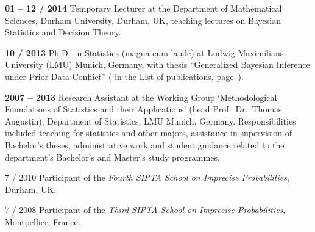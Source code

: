\documentclass[a4paper]{simplecv}
\begin{document}
\begin{topic}
\item[\hspace*{-2ex}\bfseries 01 -- 12 / 2014]Temporary Lecturer
                  at the Department of Mathematical Sciences,
                  Durham University, Durham, UK,
                  teaching lectures on Bayesian Statistics and Decision Theory. 


\item[\hspace*{-2ex}\bfseries 10 / 2013] Ph.D.\ in Statistics (magna cum laude) at
                  Lud\-wig-Maximi\-li\-ans-Uni\-ver\-si\-ty (LMU) Munich, Germany,
                  with thesis ``Generalized Bayesian Inference under Prior-Data Conflict''
                  (\cite{diss} in the List of publications, page~\pageref{publications}).


\item[\hspace*{-2ex}\bfseries 2007 -- 2013] Research Assistant at the Working Group `Methodological Foundations of Statistics and their Applications'
                    (head Prof.\ Dr.\ Thomas Augustin),
                    Department of Statistics, LMU Munich, Germany.
                    Responsibilities included teaching for statistics and other majors, %
                    assistance in supervision of Bachelor's theses,
                    administrative work and student guidance related to the department's Bachelor's and Master's study programmes.

\item[7 / 2010] Participant of the \emph{Fourth SIPTA School on Imprecise Probabilities}, Durham, UK.

\item[7 / 2008] Participant of the \emph{Third SIPTA School on Imprecise Probabilities}, Montpellier, France.


\end{topic}
\end{document}

